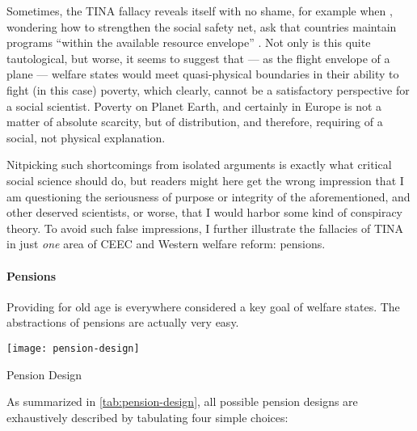 Sometimes, the TINA fallacy reveals itself with no shame, for example when \citeauthor{Grow2005}, wondering how to strengthen the social safety net, ask that countries maintain programs ``within the available resource envelope'' \citeyearpar[39]{Grow2005}.
Not only is this quite tautological, but worse, it seems to suggest that --- as the flight envelope of a plane --- welfare states would meet quasi-physical boundaries in their ability to fight (in this case) poverty, which clearly, cannot be a satisfactory perspective for a social scientist.
Poverty on Planet Earth, and certainly in Europe is not a matter of absolute scarcity, but of distribution, and therefore, requiring of a social, not physical explanation.

Nitpicking such shortcomings from isolated arguments is exactly what critical social science should do, but readers might here get the wrong impression that I am questioning the seriousness of purpose or integrity of the aforementioned, and other deserved scientists, or worse, that I would harbor some kind of conspiracy theory.
To avoid such false impressions, I further illustrate the fallacies of TINA in just \emph{one} area of \gls{CEEC} and Western welfare reform:
pensions.

\paragraph{Pensions}
	\label{sec:pensions}
Providing for old age is everywhere considered a key goal of welfare states.
The abstractions of pensions are actually very easy.

 \begin{table}[htbp]
	\centering
	\texttt{[image: pension-design]}
	\caption{Pension Design}
	\label{tab:pension-design}
\end{table}%

As summarized in \autoref{tab:pension-design}, all possible pension designs are exhaustively described by tabulating four simple choices:

